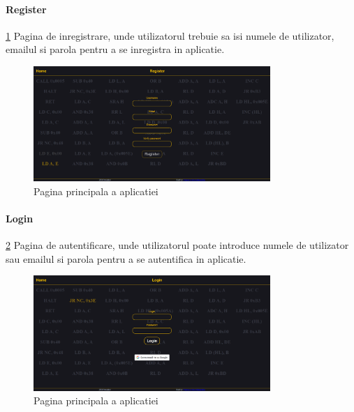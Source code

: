 \documentclass[titlepage,12pt]{article}
\begin{document}
\paragraph {Register} \cref {fig:registerpage} Pagina de inregistrare, unde utilizatorul trebuie sa isi numele de utilizator, emailul si parola pentru a se inregistra in aplicatie.
\begin{figure}[h!]
    \centering
    \includegraphics[width=0.8\textwidth]{images/registerpage.png}
    \caption{Pagina principala a aplicatiei}
    \label{fig:registerpage}
\end{figure}

\paragraph {Login} \cref {fig:loginpage} Pagina de autentificare, unde utilizatorul poate introduce numele de utilizator sau emailul si parola pentru a se autentifica in aplicatie.
\begin{figure}[h!]
    \centering
    \includegraphics[width=0.8\textwidth]{images/loginpage.png}
    \caption{Pagina principala a aplicatiei}
    \label{fig:loginpage}
\end{figure}
\end{document}
